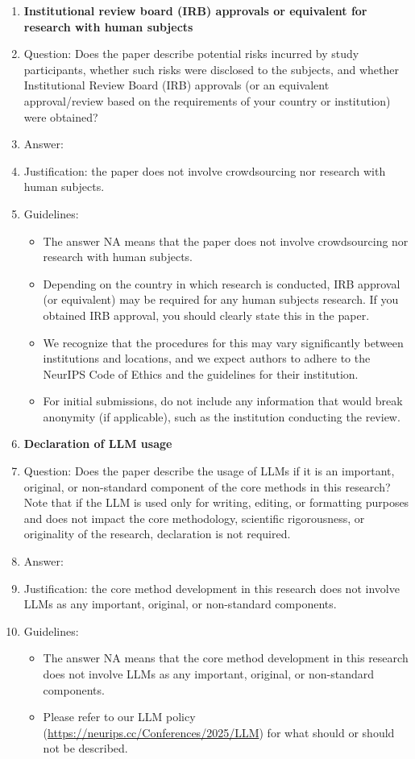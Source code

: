 \documentclass{article}
\begin{document}
\begin{enumerate}
\item {\bf Institutional review board (IRB) approvals or equivalent for research with human subjects}
    \item[] Question: Does the paper describe potential risks incurred by study participants, whether such risks were disclosed to the subjects, and whether Institutional Review Board (IRB) approvals (or an equivalent approval/review based on the requirements of your country or institution) were obtained?
    \item[] Answer: \answerNA{} %
    \item[] Justification: the paper does not involve crowdsourcing nor research with human subjects.
    \item[] Guidelines:
    \begin{itemize}
        \item The answer NA means that the paper does not involve crowdsourcing nor research with human subjects.
        \item Depending on the country in which research is conducted, IRB approval (or equivalent) may be required for any human subjects research. If you obtained IRB approval, you should clearly state this in the paper. 
        \item We recognize that the procedures for this may vary significantly between institutions and locations, and we expect authors to adhere to the NeurIPS Code of Ethics and the guidelines for their institution. 
        \item For initial submissions, do not include any information that would break anonymity (if applicable), such as the institution conducting the review.
    \end{itemize}

\item {\bf Declaration of LLM usage}
    \item[] Question: Does the paper describe the usage of LLMs if it is an important, original, or non-standard component of the core methods in this research? Note that if the LLM is used only for writing, editing, or formatting purposes and does not impact the core methodology, scientific rigorousness, or originality of the research, declaration is not required.
    \item[] Answer: \answerNA{} %
    \item[] Justification: the core method development in this research does not involve LLMs as any important, original, or non-standard components.
    \item[] Guidelines:
    \begin{itemize}
        \item The answer NA means that the core method development in this research does not involve LLMs as any important, original, or non-standard components.
        \item Please refer to our LLM policy (\url{https://neurips.cc/Conferences/2025/LLM}) for what should or should not be described.
    \end{itemize}

\end{enumerate}
\end{document}
